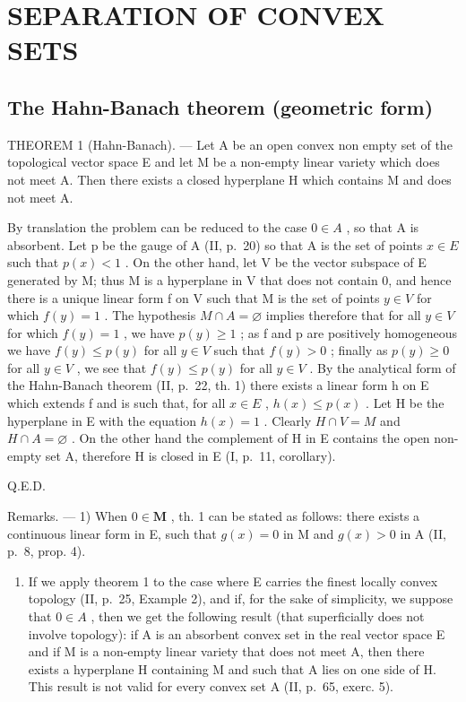 \section{SEPARATION OF CONVEX SETS}

\subsection{The Hahn-Banach theorem (geometric form)}

THEOREM 1 (Hahn-Banach). --- Let A be an open convex non empty set of the topological vector space E and let M be a non-empty linear variety which does not meet A. Then there exists a closed hyperplane H which contains M and does not meet A.

By translation the problem can be reduced to the case \(0 \in A\) , so that A is absorbent. Let p be the gauge of A (II, p.~20) so that A is the set of points \(x \in E\) such that \(p(x) < 1\) . On the other hand, let V be the vector subspace of E generated by M; thus M is a hyperplane in V that does not contain 0, and hence there is a unique linear form f on V such that M is the set of points \(y \in V\) for which \(f(y) = 1\) . The hypothesis \(M \cap A = \varnothing\) implies therefore that for all \(y \in V\) for which \(f(y) = 1\) , we have \(p(y) \geqslant 1\) ; as f and p are positively homogeneous we have \(f(y) \leqslant p(y)\) for all \(y \in V\) such that \(f(y) > 0\) ; finally as \(p(y) \geqslant 0\) for all \(y \in V\) , we see that \(f(y) \leqslant p(y)\) for all \(y \in V\) . By the analytical form of the Hahn-Banach theorem (II, p.~22, th. 1) there exists a linear form h on E which extends f and is such that, for all \(x \in E\) , \(h(x) \leqslant p(x)\) . Let H be the hyperplane in E with the equation \(h(x) = 1\) . Clearly \(H \cap V = M\) and \(H \cap A = \varnothing\) . On the other hand the complement of H in E contains the open non-empty set A, therefore H is closed in E (I, p.~11, corollary).

Q.E.D.

Remarks. --- 1) When \(0 \in \mathbf{M}\) , th. 1 can be stated as follows: there exists a continuous linear form in E, such that \(g(x) = 0\) in M and \(g(x) > 0\) in A (II, p.~8, prop. 4).

\begin{enumerate}
\def\labelenumi{\arabic{enumi})}
\setcounter{enumi}{1}
\tightlist
\item
  If we apply theorem 1 to the case where E carries the finest locally convex topology (II, p.~25, Example 2), and if, for the sake of simplicity, we suppose that \(0 \in A\) , then we get the following result (that superficially does not involve topology): if A is an absorbent convex set in the real vector space E and if M is a non-empty linear variety that does not meet A, then there exists a hyperplane H containing M and such that A lies on one side of H. This result is not valid for every convex set A (II, p.~65, exerc. 5).
\end{enumerate}

